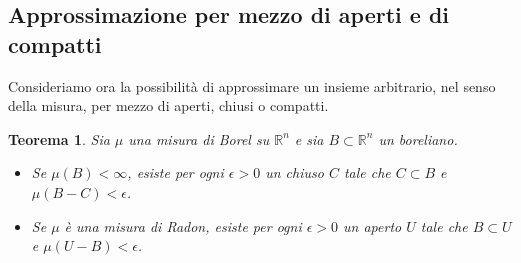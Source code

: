 \documentclass[a4paper,10pt,openright,oneside]{book}
\theoremstyle{theoremstyle}
\newtheorem{teorema}{Teorema}[section]
\theoremstyle{theoremstylewoheader}
\theoremstyle{theoremstyle}
\theoremstyle{proofsecstyle}
\theoremstyle{nonumberplain}
\newcommand{\RR}{\ensuremath{\mathbb{R}}}
\begin{document}
\subsection{Approssimazione per mezzo di aperti e di compatti}

Consideriamo ora la possibilità di approssimare un insieme arbitrario, nel senso della misura, per mezzo di aperti, chiusi o compatti.

\begin{teorema}
\label{lem:approssimazione_con_aperti_e_compatti}
Sia $\mu$ una misura di Borel su $\RR^n$ e sia $B \subset \RR^n$ un boreliano.
\begin{itemize}
\item[(i)] Se $\mu(B) < \infty$, esiste per ogni $\epsilon > 0$ un chiuso $C$ tale che $C \subset B$ e $\mu(B - C) < \epsilon$.
\item[(ii)] Se $\mu$ è una misura di Radon, esiste per ogni $\epsilon > 0$ un aperto $U$ tale che $B \subset U$ e $\mu(U - B) < \epsilon$.
\end{itemize}
\end{teorema}
\end{document}
